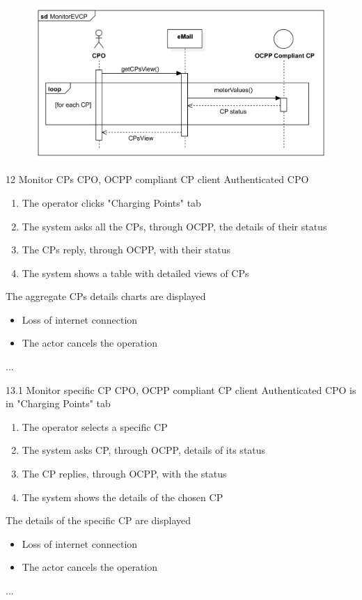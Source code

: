 \usecase
{
    \begin{figure}[H]
        \centering
        \includegraphics[scale=0.9]{src/sequence_diagram/monitorEVCP.png}
    \end{figure}
}
{12}
{Monitor CPs} %
{CPO, OCPP compliant CP client} %
{Authenticated CPO} %
{ %
    \begin{enumerate}
        \item The operator clicks "Charging Points" tab
        \item The system asks all the CPs, through OCPP, the details of their status
        \item The CPs reply, through OCPP, with their status
        \item The system shows a table with detailed views of CPs
    \end{enumerate}
}
{The aggregate CPs details charts are displayed} %
{ %
    \begin{itemize}
        \item Loss of internet connection
        \item The actor cancels the operation
    \end{itemize}
}
{ %
    ...
}

\usecase
{

}
{13.1}
{Monitor specific CP} %
{CPO, OCPP compliant CP client} %
{Authenticated CPO is in "Charging Points" tab} %
{ %
    \begin{enumerate}
        \item The operator selects a specific CP
        \item The system asks CP, through OCPP, details of its status
        \item The CP replies, through OCPP, with the status
        \item The system shows the details of the chosen CP
    \end{enumerate}
}
{The details of the specific CP are displayed} %
{ %
    \begin{itemize}
        \item Loss of internet connection
        \item The actor cancels the operation
    \end{itemize}
}
{ %
    ...
}


